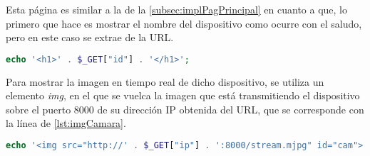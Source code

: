 Esta página es similar a la de la \autoref{subsec:implPagPrincipal} en cuanto a que, lo primero que hace es mostrar el nombre del dispositivo como ocurre con el saludo, pero en este caso se extrae de la URL\@.
\begin{lstlisting}[language=PHP, caption=Nombre del dispositivo en la cabecera de la página, label=lst:nombreDispositivo]
echo '<h1>' . $_GET["id"] . '</h1>';
\end{lstlisting}

Para mostrar la imagen en tiempo real de dicho dispositivo, se utiliza un elemento \textit{img}, en el que se vuelca la imagen que está transmitiendo el dispositivo sobre el puerto 8000 de su dirección IP obtenida del URL, que se corresponde con la línea de \autoref{lst:imgCamara}.
\begin{lstlisting}[language=PHP, caption=Cuadro de imagen de la cámara, label=lst:imgCamara]
echo '<img src="http://' . $_GET["ip"] . ':8000/stream.mjpg" id="cam">'
\end{lstlisting}

